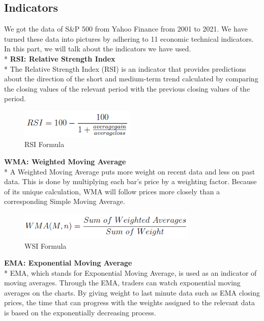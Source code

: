 \documentclass{article}
\begin{document}
\subsection{Indicators}
We got the data of S\&P 500 from Yahoo Finance from 2001 to 2021. We have turned these data into pictures by adhering to 11 economic technical indicators. In this part, we will talk about the indicators we have used.\vspace{0.3cm}\\*
\textbf{RSI: Relative Strength Index}\\*
The Relative Strength Index (RSI) is an indicator that provides predictions about the direction of the short and medium-term trend calculated by comparing the closing values of the relevant period with the previous closing values of the period.
\begin{figure}[H]
\begin{center}
   \includegraphics[width=55mm,scale=0.5]{assets/formulas/rsi.png}
   \caption{RSI Formula}
\end{center}
\end{figure}
\noindent
\textbf{WMA: Weighted Moving Average} \\*
A Weighted Moving Average puts more weight on recent data and less on past data. This is done by multiplying each bar’s price by a weighting factor. Because of its unique calculation, WMA will follow prices more closely than a corresponding Simple Moving Average.
\begin{figure}[H]
\begin{center}
   \includegraphics[width=85mm,scale=0.8]{assets/formulas/wma.png}
   \caption{WSI Formula}
\end{center}
\end{figure}
\noindent
\textbf{EMA: Exponential Moving Average} \\*
EMA, which stands for Exponential Moving Average, is used as an indicator of moving averages. Through the EMA, traders can watch exponential moving averages on the charts. By giving weight to last minute data such as EMA closing prices, the time that can progress with the weights assigned to the relevant data is based on the exponentially decreasing process.
\end{document}
